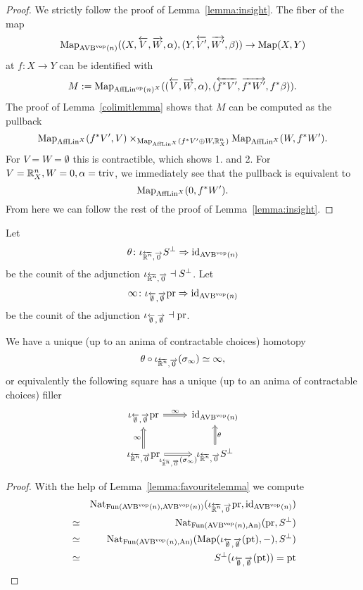 \begin{proof}
    We strictly follow the proof of Lemma~\ref{lemma:insight}.
    The fiber of the map 
    \[
    \operatorname{Map}_{\operatorname{AVB}^{\mathrm{vop}}(n)}((X,\overleftarrow{V},\overrightarrow{W}, \alpha), (Y,\overleftarrow{V'},\overrightarrow{W'},\beta)) \to \operatorname{Map}(X,Y)   
    \]
    at $f \colon X \to Y$ can be identified with 
    \[
    M := \operatorname{Map}_{\operatorname{AffLin}^{\mathrm{op}}(n)^X}((\overleftarrow{V},\overrightarrow{W}, \alpha), (\overleftarrow{f^*V'},\overrightarrow{f^*W'},f^*\beta)).
    \]
    The proof of Lemma~\ref{colimitlemma} shows that $M$ can be computed as the pullback 
    \[
      \operatorname{Map}_{\operatorname{AffLin}^X}(f^*V', V) \times_{\operatorname{Map}_{\operatorname{AffLin}^X}(f^*V' \oplus W, \mathbb{R}^n_X)} \operatorname{Map}_{\operatorname{AffLin}^X}(W,f^*W').
    \] 
    For $V = W = \emptyset$ this is contractible, which shows 1. and 2.
    For $V = \mathbb{R}^n_X, W = 0, \alpha = \mathrm{triv}$, we immediately see that the pullback is equivalent to 
    \[
      \operatorname{Map}_{\operatorname{AffLin}^X}(0,f^*W').  
    \]
    From here we can follow the rest of the proof of Lemma~\ref{lemma:insight}.
\end{proof}

\begin{construction}
    Let
    \[
        \theta \colon \iota_{\overleftarrow{\mathbb{R}^n},\overrightarrow{0}} S^\perp \Rightarrow \mathrm{id}_{\operatorname{AVB}^{\mathrm{vop}}(n)}    
    \]
    be the counit of the adjunction 
    $\iota_{\overleftarrow{\mathbb{R}^n},\overrightarrow{0}} \dashv S^\perp$. 
    Let 
    \[
      \infty \colon \iota_{\overleftarrow{\emptyset},\overrightarrow{\emptyset}} \mathrm{pr} \Rightarrow \mathrm{id}_{\operatorname{AVB}^{\mathrm{vop}}(n)}  
    \]
    be the counit of the adjunction 
    $\iota_{\overleftarrow{\emptyset},\overrightarrow{\emptyset}} \dashv \mathrm{pr}$.
\end{construction}

\begin{proposition}
    We have a unique (up to an anima of contractable choices) homotopy
    \[
      \theta \circ \iota_{\overleftarrow{\mathbb{R}^n},\overrightarrow{0}}(\sigma_\infty) \simeq \infty , 
    \]
    or equivalently the following square has a unique (up to an anima of contractable choices) filler 
    \[\begin{tikzcd}
        {\iotaemptyempty \pr} & {\id_{\AVB^\vop(n)}} \\
        {\iotarnzero \pr} & {\iotarnzero S^\perp}
        \arrow["{\iotarnzero(\sigma_\infty)}"', Rightarrow, from=2-1, to=2-2]
        \arrow["\theta"', Rightarrow, from=2-2, to=1-2]
        \arrow["\infty", Rightarrow, from=2-1, to=1-1]
        \arrow["\infty", Rightarrow, from=1-1, to=1-2]
    \end{tikzcd}\label{diag:AVB(n)square}\]\label{prop: thomatinftyinavb(n)}
\end{proposition}
\begin{proof}
    With the help of Lemma~\ref{lemma:favouritelemma} we compute 
    \begin{eqnarray*}
        & & \operatorname{Nat}_{\operatorname{Fun}(\operatorname{AVB}^{\mathrm{vop}}(n), \operatorname{AVB}^{\mathrm{vop}}(n))}(\iota_{\overleftarrow{\mathbb{R}^n},\overrightarrow{0}} \mathrm{pr}, \mathrm{id}_{\operatorname{AVB}^{\mathrm{vop}}(n)}) \\ 
        & \simeq & \operatorname{Nat}_{\operatorname{Fun}(\operatorname{AVB}^{\mathrm{vop}}(n), \operatorname{An})}(\mathrm{pr}, S^\perp)\\
        & \simeq & \operatorname{Nat}_{\operatorname{Fun}(\operatorname{AVB}^{\mathrm{vop}}(n), \operatorname{An})}(\operatorname{Map}(\iota_{\overleftarrow{\emptyset},\overrightarrow{\emptyset}}(\mathrm{pt}), -), S^\perp) \\
        & \simeq & S^\perp( \iota_{\overleftarrow{\emptyset},\overrightarrow{\emptyset}}(\mathrm{pt})) = \mathrm{pt} 
    \end{eqnarray*}
\end{proof}

